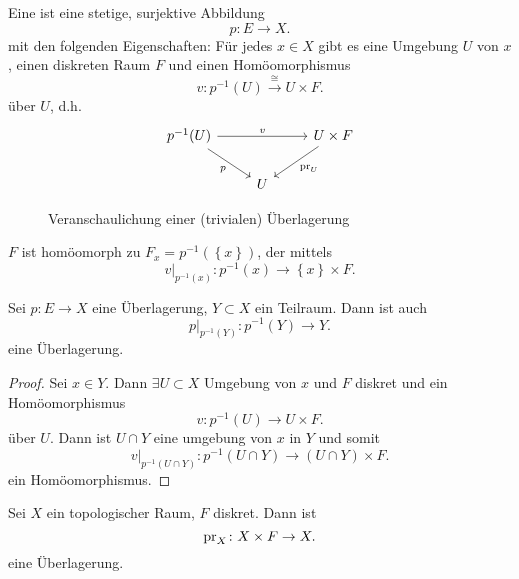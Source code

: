 \begin{definition}[Überlagerung]\label{def:überlagerung}
    Eine  ist eine stetige, surjektive Abbildung
    \[
    p\colon  E \to  X
    .\] 
    mit den folgenden Eigenschaften:
    Für jedes $x\in X$ gibt es eine Umgebung $U$ von  $x$, einen diskreten Raum  $F$ und einen Homöomorphismus
     \[
         v\colon  p^{-1}(U) \stackrel{\cong}{\longrightarrow} U \times F
    .\] 
    über $U$, d.h.
    \[
\begin{tikzcd}
    p^{-1}(U) \ar{rr}{v} \ar[swap]{dr}{p}& &  U \times F \ar{dl}{\pr_U} \\
                          & U
\end{tikzcd}
\]
\end{definition}

\begin{figure}[ht]
    \centering
    \caption{Veranschaulichung einer (trivialen) Überlagerung}
    \label{fig:definition-überlagerung}
\end{figure}


\begin{remark}
    $F$ ist homöomorph zu  $F_x = p^{-1}(\left \{x\right\} )$, der  mittels
    \[
        v|_{p^{-1}(x)} \colon  p^{-1}(x) \to  \left \{x\right\} \times F
    .\] 
\end{remark}


\begin{lemma}\label{lm:überlagerung-von-teilräumen}
    Sei $p\colon E \to  X$ eine Überlagerung, $Y\subset X$ ein Teilraum. Dann ist auch
    \[
        p|_{p^{-1} (Y)} \colon  p^{-1} (Y) \to  Y
    .\] 
    eine Überlagerung.
\end{lemma}

\begin{proof}
    Sei $x\in Y$. Dann $\exists U\subset X$ Umgebung von $x$ und  $F$ diskret und ein Homöomorphismus
     \[
         v\colon  p^{-1} (U) \to  U\times F
    .\] 
    über $U$. Dann ist $U\cap Y$ eine umgebung von $x$ in $Y$ und somit
     \[
         v|_{p^{-1} (U\cap Y)}\colon p^{-1} (U\cap Y) \to  (U\cap Y) \times F
    .\] 
    ein Homöomorphismus.
\end{proof}

\begin{example}
    Sei $X$ ein topologischer Raum,  $F$ diskret. Dann ist
     \[
    \operatorname{pr}_X \colon  X \times F \to  X
    .\] 
    eine Überlagerung.
\end{example}

